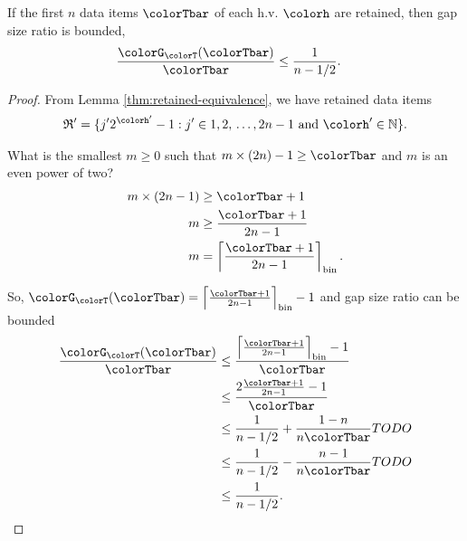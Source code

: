\begin{lemma}
\label{thm:gap-size-ratio-stretched}
If the first $n$ data items $\colorTbar$ of each h.v. $\colorh$ are retained, then gap size ratio is bounded,
\begin{align*}
\frac{\colorG_{\colorT}(\colorTbar)}{\colorTbar}
&\leq
\frac{1}{n - 1/2}.
\end{align*}
\end{lemma}
\begin{proof}

From Lemma \ref{thm:retained-equivalence}, we have retained data items
\begin{align*}
\mathfrak{R}' =
\{
  j'2^{\colorh'} - 1
  :
  j' \in 1,2,\,\ldots,2n - 1
  \text{ and }
  \colorh' \in \mathbb{N}
\}.
\end{align*}


What is the smallest $m \geq 0$ such that $m \times (2n) - 1 \geq \colorTbar$ and $m$ is an even power of two?
\begin{align*}
m \times (2n - 1)
&\geq \colorTbar + 1\\
m
&\geq \frac{\colorTbar + 1}{2n - 1}\\
m
&= \left\lceil \frac{\colorTbar + 1 }{2n - 1} \right\rceil_{\mathrm{bin}}.
\end{align*}

So, $\colorG_{\colorT}(\colorTbar) = \left\lceil \frac{\colorTbar + 1 }{2n - 1} \right\rceil_{\mathrm{bin}} - 1$ and gap size ratio can be bounded
\begin{align*}
\frac{\colorG_{\colorT}(\colorTbar)}{\colorTbar}
&\leq
\frac{
\left\lceil \frac{\colorTbar + 1 }{2n - 1} \right\rceil_{\mathrm{bin}} - 1
}{
\colorTbar
}\\
&\leq
\frac{
2\frac{\colorTbar + 1}{2n - 1} - 1
}{
\colorTbar
}\\
&\leq
\frac{1}{n - 1/2} + \frac{1 - n}{n\colorTbar}TODO\\
&\leq
\frac{1}{n - 1/2} - \frac{n - 1}{n\colorTbar}TODO\\
&\leq
\frac{1}{n - 1/2}.
\end{align*}

\end{proof}
